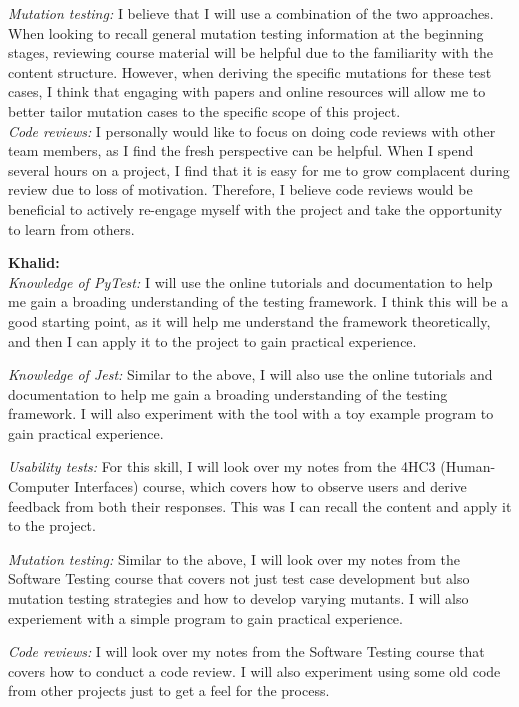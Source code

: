 \documentclass[12pt, titlepage]{article}
\begin{document}
\begin{enumerate}
  \textit{Mutation testing:} I believe that I will use a combination of the two approaches. When looking to recall general mutation testing information at the beginning stages, reviewing course material will be helpful due to the familiarity with the content structure. However, when deriving the specific mutations for these test cases, I think that engaging with papers and online resources will allow me to better tailor mutation cases to the specific scope of this project.\\

  \textit{Code reviews:} I personally would like to focus on doing code reviews with other team members, as I find the fresh perspective can be helpful. When I spend several hours on a project, I find that it is easy for me to grow complacent during review due to loss of motivation. Therefore, I believe code reviews would be beneficial to actively re-engage myself with the project and take the opportunity to learn from others.

  \textbf{Khalid:}\\
  \textit{Knowledge of PyTest:} I will use the online tutorials and documentation to help me gain a broading understanding of the testing framework. I think this will be a good starting point, as it will help me understand the framework theoretically, and then I can apply it to the project to gain practical experience.
  
  \textit{Knowledge of Jest:} Similar to the above, I will also use the online tutorials and documentation to help me gain a broading understanding of the testing framework. I will also experiment with the tool with a toy example program to gain practical experience.
  
  \textit{Usability tests:} For this skill, I will look over my notes from the 4HC3 (Human-Computer Interfaces) course, which covers how to observe users and derive feedback from both their responses. This was I can recall the content and apply it to the project.
  
  \textit{Mutation testing:} Similar to the above, I will look over my notes from the Software Testing course that covers not just test case development but also mutation testing strategies and how to develop varying mutants. I will also experiement with a simple program to gain practical experience.
  
  \textit{Code reviews:} I will look over my notes from the Software Testing course that covers how to conduct a code review. I will also experiment using some old code from other projects just to get a feel for the process.
  
\end{enumerate}
\end{document}
